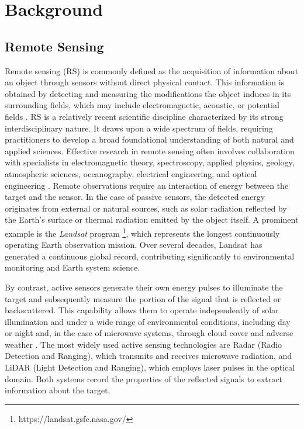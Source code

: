 \chapter{Background}

\section{Remote Sensing}
Remote sensing (RS) is commonly defined as the acquisition of information about an object through sensors without direct physical contact. This information is obtained by detecting and measuring the modifications the object induces in its surrounding fields, which may include electromagnetic, acoustic, or potential fields \cite{book_Physics_Techniques_RS}.
RS is a relatively recent scientific discipline characterized by its strong interdisciplinary nature. It draws upon a wide spectrum of fields, requiring practitioners to develop a broad foundational understanding of both natural and applied sciences. Effective research in remote sensing often involves collaboration with specialists in electromagnetic theory, spectroscopy, applied physics, geology, atmospheric sciences, oceanography, electrical engineering, and optical engineering \cite{book_Physics_Techniques_RS}.
Remote observations require an interaction of energy between the target and the sensor. In the case of passive sensors, the detected energy originates from external or natural sources, such as solar radiation reflected by the Earth's surface or thermal radiation emitted by the object itself. A prominent example is the \textit{Landsat} program \footnote{https://landsat.gsfc.nasa.gov/}, which represents the longest continuously operating Earth observation mission. Over several decades, Landsat has generated a continuous global record, contributing significantly to environmental monitoring and Earth system science.

By contrast, active sensors generate their own energy pulses to illuminate the target and subsequently measure the portion of the signal that is reflected or backscattered. This capability allows them to operate independently of solar illumination and under a wide range of environmental conditions, including day or night and, in the case of microwave systems, through cloud cover and adverse weather \cite{RS_platforms_survey}. The most widely used active sensing technologies are Radar (Radio Detection and Ranging), which transmits and receives microwave radiation, and LiDAR (Light Detection and Ranging), which employs laser pulses in the optical domain. Both systems record the properties of the reflected signals to extract information about the target.

